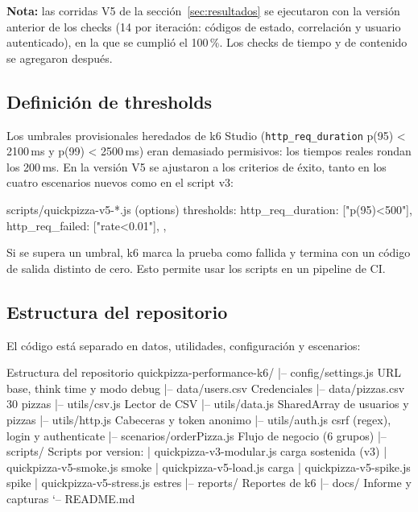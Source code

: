 \documentclass[11pt]{article}
\begin{document}
\textbf{Nota:} las corridas V5 de la sección~\ref{sec:resultados} se ejecutaron con
la versión anterior de los checks (14 por iteración: códigos de estado,
correlación y usuario autenticado), en la que se cumplió el 100\,\%. Los checks
de tiempo y de contenido se agregaron después.

\subsection{Definición de thresholds}

Los umbrales provisionales heredados de k6 Studio (\texttt{http\_req\_duration}
p(95) < 2100\,ms y p(99) < 2500\,ms) eran demasiado permisivos: los tiempos
reales rondan los 200\,ms. En la versión V5 se ajustaron a los criterios de
éxito, tanto en los cuatro escenarios nuevos como en el script v3:

\begin{archivo}[language=JavaScript]{scripts/quickpizza-v5-*.js (options)}
thresholds: {
  http_req_duration: ["p(95)<500"],
  http_req_failed: ["rate<0.01"],
},
\end{archivo}

Si se supera un umbral, k6 marca la prueba como fallida y termina con un código
de salida distinto de cero. Esto permite usar los scripts en un pipeline de CI.


\subsection{Estructura del repositorio}

El código está separado en datos, utilidades, configuración y escenarios:

\begin{archivo}{Estructura del repositorio}
quickpizza-performance-k6/
|-- config/settings.js        URL base, think time y modo debug
|-- data/users.csv            Credenciales
|-- data/pizzas.csv           30 pizzas
|-- utils/csv.js              Lector de CSV
|-- utils/data.js             SharedArray de usuarios y pizzas
|-- utils/http.js             Cabeceras y token anonimo
|-- utils/auth.js             csrf (regex), login y authenticate
|-- scenarios/orderPizza.js   Flujo de negocio (6 grupos)
|-- scripts/                  Scripts por version:
|     quickpizza-v3-modular.js      carga sostenida (v3)
|     quickpizza-v5-smoke.js        smoke
|     quickpizza-v5-load.js         carga
|     quickpizza-v5-spike.js        spike
|     quickpizza-v5-stress.js       estres
|-- reports/                  Reportes de k6
|-- docs/                     Informe y capturas
`-- README.md
\end{archivo}
\end{document}
